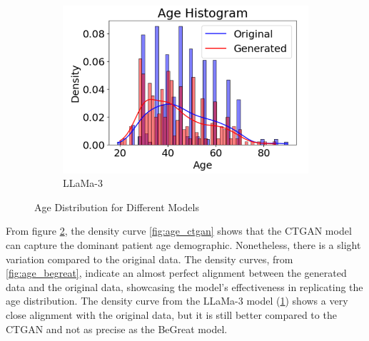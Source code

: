 \begin{figure}[H]
\begin{subfigure}[b]{0.45\textwidth}
        \includegraphics[width=\textwidth]{images/age_llama.png}
        \caption{LLaMa-3}
        \label{fig:age_llama}
    \end{subfigure}
    \caption{Age Distribution for Different Models}
    \label{fig:age_distrib}
\end{figure}

From figure \ref{fig:age_distrib}, the density curve \ref{fig:age_ctgan} shows that the CTGAN model can capture the dominant patient age demographic. Nonetheless, there is a slight variation compared to the original data.
The density curves, from \ref{fig:age_begreat}, indicate an almost perfect alignment between the generated data and the original data, showcasing the model's effectiveness in replicating the age distribution. The density curve from the LLaMa-3 model (\ref{fig:age_llama}) shows a very close alignment with the original data, but it is still better compared to the CTGAN and not as precise as the BeGreat model.


